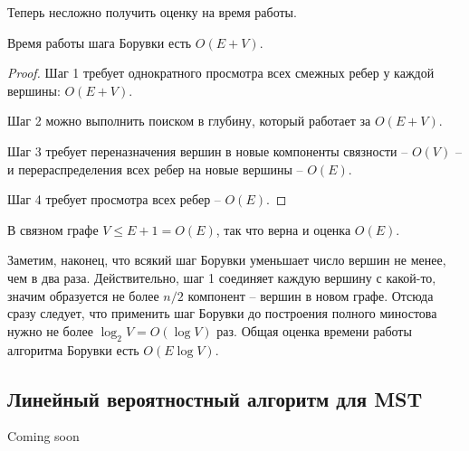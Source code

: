 Теперь несложно получить оценку на время работы.

\begin{lemma*} Время работы шага Борувки есть $O(E+V)$. \end{lemma*}
\begin{proof}

Шаг 1 требует однократного просмотра всех смежных ребер у каждой вершины: $O(E+V)$.

Шаг 2 можно выполнить поиском в глубину, который работает за $O(E+V)$.

Шаг 3 требует переназначения вершин в новые компоненты связности -- $O(V)$ -- и перераспределения всех ребер на новые вершины  -- $O(E)$.

Шаг 4 требует просмотра всех ребер -- $O(E)$.
\end{proof}

В связном графе $V \leq E + 1 = O(E)$, так что верна и оценка $O(E)$.

Заметим, наконец, что всякий шаг Борувки уменьшает число вершин не менее, чем в два раза. Действительно, шаг 1 соединяет каждую вершину с какой-то, значим образуется не более $n/2$ компонент -- вершин в новом графе. Отсюда сразу следует, что применить шаг Борувки до построения полного миностова нужно не более $\log_2 V = O(\log V)$ раз. Общая оценка времени работы алгоритма Борувки есть $O(E\log V)$.

\subsection{Линейный вероятностный алгоритм для MST}

Coming soon
